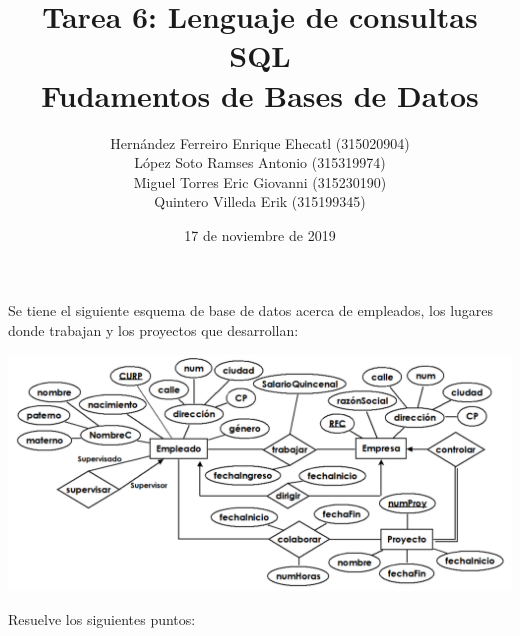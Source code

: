 \documentclass[12pt, letterpaper]{article}
\author{Hernández Ferreiro Enrique Ehecatl (315020904) \\
        López Soto Ramses Antonio (315319974) \\
        Miguel Torres Eric Giovanni (315230190) \\
        Quintero Villeda Erik (315199345)}
\title{Tarea 6: Lenguaje de consultas SQL \\
       {\small Fudamentos de Bases de Datos}}
\date{17 de noviembre de 2019}
\begin{document}
\maketitle

Se tiene el siguiente esquema de base de datos acerca de empleados, los lugares donde trabajan y los proyectos que desarrollan:

\begin{center}
	\includegraphics[scale=0.2]{meTrabajo.png}
\end{center}

Resuelve los siguientes puntos:
\end{document}
